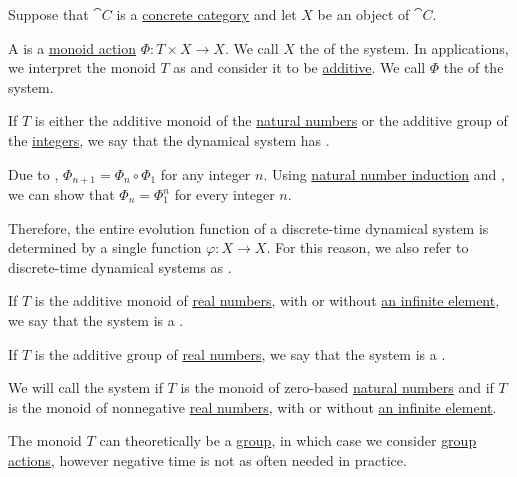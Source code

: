 \begin{definition}\label{def:dynamical_system}\mimprovised
  Suppose that \( \cat{C} \) is a \hyperref[def:concrete_category]{concrete category} and let \( X \) be an object of \( \cat{C} \).

  A  is a \hyperref[def:monoid_action]{monoid action} \( \Phi: T \times X \to X \). We call \( X \) the  of the system. In applications, we interpret the monoid \( T \) as  and consider it to be \hyperref[rem:additive_magma]{additive}. We call \( \Phi \) the  of the system.

  \begin{thmenum}
     If \( T \) is either the additive monoid of the \hyperref[def:set_of_natural_numbers]{natural numbers} or the additive group of the \hyperref[def:set_of_integers]{integers}, we say that the dynamical system has .

    Due to , \( \Phi_{n+1} = \Phi_n \circ \Phi_1 \) for any integer \( n \). Using \hyperref[rem:induction/peano_arithmetic]{natural number induction} and , we can show that \( \Phi_n = \Phi_1^n \) for every integer \( n \).

    Therefore, the entire evolution function of a discrete-time dynamical system is determined by a single function \( \varphi: X \to X \). For this reason, we also refer to discrete-time dynamical systems as .

     If \( T \) is the additive monoid of \hyperref[def:set_of_real_numbers]{real numbers}, with or without \hyperref[def:extended_real_numbers]{an infinite element}, we say that the system is a .

     If \( T \) is the additive group of \hyperref[def:set_of_real_numbers]{real numbers}, we say that the system is a .
  \end{thmenum}

  We will call the system  if \( T \) is the monoid of zero-based \hyperref[def:set_of_natural_numbers]{natural numbers} and  if \( T \) is the monoid of nonnegative \hyperref[def:set_of_real_numbers]{real numbers}, with or without \hyperref[def:extended_real_numbers]{an infinite element}.

  The monoid \( T \) can theoretically be a \hyperref[def:group]{group}, in which case we consider \hyperref[def:group_action]{group actions}, however negative time is not as often needed in practice.
\end{definition}

